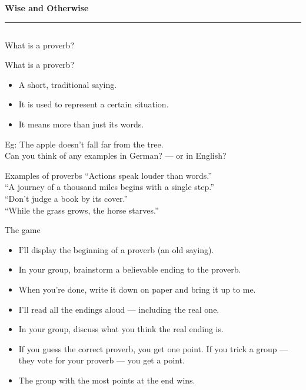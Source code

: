 \documentclass[aspectratio=169,11pt]{beamer}
\begin{document}
\begin{frame}[plain]
  \begin{columns}[c,onlytextwidth]
    \begin{column}{\textwidth}
      {\fontsize{36}{42}\selectfont\bfseries\color{navy} Wise and Otherwise\par}\vspace{0.6em}
      {\color{oldred}\rule{3cm}{1.5pt}}
    \end{column}
  \end{columns}
\end{frame}

\begin{frame}[t]{What is a proverb?}
\end{frame}

\begin{frame}{What is a proverb?}
  \begin{itemize}\setlength{\itemsep}{0.7em}
    \item A short, traditional saying.
    \item It is used to represent a certain situation.
    \item It means more than just its words.
  \end{itemize}
  \vspace{1.2em}
  Eg: \alert{The apple doesn't fall far from the tree.}\\[1.2em]
  Can you think of any examples in German? --- or in English?
\end{frame}

\begin{frame}{Examples of proverbs}
  \large
  ``Actions speak louder than words.''\\[1em]
  ``A journey of a thousand miles begins with a single step.''\\[1em]
  ``Don't judge a book by its cover.''\\[1em]
  ``While the grass grows, the horse starves.''
\end{frame}

\begin{frame}{The game}
  \begin{itemize}\setlength{\itemsep}{0.55em}
    \item I'll display the beginning of a proverb (an old saying).
    \item In your group, brainstorm a believable ending to the proverb.
    \item When you're done, write it down on paper and bring it up to me.
    \item I'll read all the endings aloud --- including the real one.
    \item In your group, discuss what you think the real ending is.
    \item If you guess the correct proverb, you get one point. If you trick a group --- they vote for your proverb --- you get a point.
    \item The group with the most points at the end wins.
  \end{itemize}
\end{frame}
\end{document}
